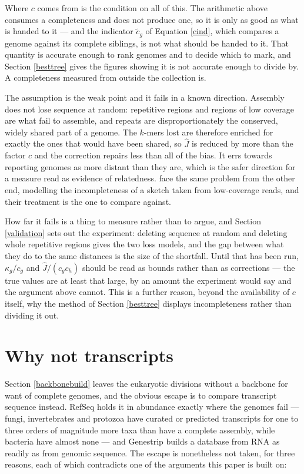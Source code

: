 \documentclass[pdflatex,sn-vancouver-num]{sn-jnl}
\begin{document}
\begin{appendices}
Where $c$ comes from is the condition on all of this. The arithmetic above consumes a completeness
and does not produce one, so it is only as good as what is handed to it --- and the indicator
$\tilde{c}_g$ of Equation \eqref{cind}, which compares a genome against its complete siblings, is not
what should be handed to it. That quantity is accurate enough to rank genomes and to decide which to
mark, and Section \ref{besttree} gives the figures showing it is not accurate enough to divide by.
A completeness measured from outside the collection is.

The assumption is the weak point and it fails in a known direction. Assembly does not lose sequence
at random: repetitive regions and regions of low coverage are what fail to assemble, and repeats are
disproportionately the conserved, widely shared part of a genome. The $k$-mers lost are therefore
enriched for exactly the ones that would have been shared, so $\widehat{J}$ is reduced by more than
the factor $c$ and the correction repairs less than all of the bias. It errs towards reporting
genomes as more distant than they are, which is the safer direction for a measure read as evidence of
relatedness. \cite{skmer} face the same problem from the other end, modelling the incompleteness of a
sketch taken from low-coverage reads, and their treatment is the one to compare against.

How far it fails is a thing to measure rather than to argue, and Section \ref{validation} sets out
the experiment: deleting sequence at random and deleting whole repetitive regions gives the two loss
models, and the gap between what they do to the same distances is the size of the shortfall. Until
that has been run, $\kappa_g/c_g$ and $\widehat{J}/(c_g c_h)$ should be read as bounds rather than as
corrections --- the true values are at least that large, by an amount the experiment would say and
the argument above cannot. This is a further reason, beyond the availability of $c$ itself, why the
method of Section \ref{besttree} displays incompleteness rather than dividing it out.


\section{Why not transcripts}\label{rna}

Section \ref{backbonebuild} leaves the eukaryotic divisions without a backbone for want of complete
genomes, and the obvious escape is to compare transcript sequence instead. RefSeq holds it in
abundance exactly where the genomes fail --- fungi, invertebrates and protozoa have curated or
predicted transcripts for one to three orders of magnitude more taxa than have a complete assembly,
while bacteria have almost none --- and Genestrip builds a database from RNA as readily as from
genomic sequence. The escape is nonetheless not taken, for three reasons, each of which contradicts
one of the arguments this paper is built on:


\end{appendices}
\end{document}
